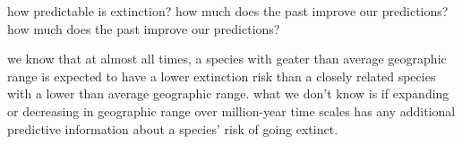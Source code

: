 \documentclass[12pt,letterpaper]{article}
\begin{document}
how predictable is extinction? how much does the past improve our predictions? how much does the past improve our predictions?

we know that at almost all times, a species with geater than average geographic range is expected to have a lower extinction risk than a closely related species with a lower than average geographic range. what we don't know is if expanding or decreasing in geographic range over million-year time scales has any additional predictive information about a species' risk of going extinct.
\end{document}
